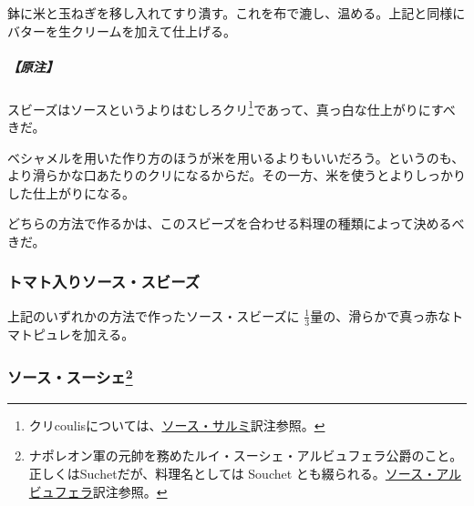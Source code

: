\begin{recette}
鉢に米と玉ねぎを移し入れてすり潰す。これを布で漉し、温める。上記と同様にバターを生クリームを加えて仕上げる。

\hypertarget{nota-sauce-soubise}{%
\subparagraph{【原注】}\label{nota-sauce-soubise}}

スビーズはソースというよりはむしろクリ\footnote{クリcoulisについては、\protect\hyperlink{sauce-salmis}{ソース・サルミ}訳注参照。}であって、真っ白な仕上がりにすべきだ。

ベシャメルを用いた作り方のほうが米を用いるよりもいいだろう。というのも、より滑らかな口あたりのクリになるからだ。その一方、米を使うとよりしっかりした仕上がりになる。

どちらの方法で作るかは、このスビーズを合わせる料理の種類によって決めるべきだ。

\hypertarget{sauce-soubise-tomatee}{%
\subsubsection{トマト入りソース・スビーズ}\label{sauce-soubise-tomatee}}



上記のいずれかの方法で作ったソース・スビーズに
\(\frac{1}{3}\)量の、滑らかで真っ赤なトマトピュレを加える。

\hypertarget{sauce-souchet}{%
\subsubsection[ソース・スーシェ]{\texorpdfstring{ソース・スーシェ\footnote{ナポレオン軍の元帥を務めたルイ・スーシェ・アルビュフェラ公爵のこと。
  正しくはSuchetだが、料理名としては Souchet
  とも綴られる。\protect\hyperlink{sauce-albufera}{ソース・アルビュフェラ}訳注参照。}}{ソース・スーシェ}}\label{sauce-souchet}}




\end{recette}
